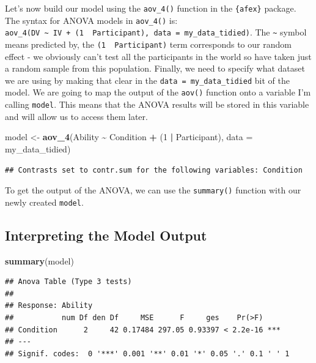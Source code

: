 \documentclass[
]{book}
\newenvironment{Shaded}{\begin{snugshade}}{\end{snugshade}}
\newcommand{\AttributeTok}[1]{\textcolor[rgb]{0.13,0.29,0.53}{#1}}
\newcommand{\DecValTok}[1]{\textcolor[rgb]{0.00,0.00,0.81}{#1}}
\newcommand{\FunctionTok}[1]{\textcolor[rgb]{0.13,0.29,0.53}{\textbf{#1}}}
\newcommand{\NormalTok}[1]{#1}
\newcommand{\OtherTok}[1]{\textcolor[rgb]{0.56,0.35,0.01}{#1}}
\newcommand{\SpecialCharTok}[1]{\textcolor[rgb]{0.81,0.36,0.00}{\textbf{#1}}}
\begin{document}
Let's now build our model using the \texttt{aov\_4()} function in the \texttt{\{afex\}} package. The syntax for ANOVA models in \texttt{aov\_4()} is: \texttt{aov\_4(DV\ \textasciitilde{}\ IV\ +\ (1\ \textbar{}\ Participant),\ data\ =\ my\_data\_tidied)}. The \texttt{\textasciitilde{}} symbol means predicted by, the \texttt{(1\ \textbar{}\ Participant)} term corresponds to our random effect - we obviously can't test all the participants in the world so have taken just a random sample from this population. Finally, we need to specify what dataset we are using by making that clear in the \texttt{data\ =\ my\_data\_tidied} bit of the model. We are going to map the output of the \texttt{aov()} function onto a variable I'm calling \texttt{model}. This means that the ANOVA results will be stored in this variable and will allow us to access them later.

\begin{Shaded}
\begin{Highlighting}[]
\NormalTok{model }\OtherTok{\textless{}{-}} \FunctionTok{aov\_4}\NormalTok{(Ability }\SpecialCharTok{\textasciitilde{}}\NormalTok{ Condition }\SpecialCharTok{+}\NormalTok{ (}\DecValTok{1} \SpecialCharTok{|}\NormalTok{ Participant), }\AttributeTok{data =}\NormalTok{ my\_data\_tidied)}
\end{Highlighting}
\end{Shaded}

\begin{verbatim}
## Contrasts set to contr.sum for the following variables: Condition
\end{verbatim}

To get the output of the ANOVA, we can use the \texttt{summary()} function with our newly created \texttt{model}.

\hypertarget{interpreting-the-model-output}{%
\subsection{Interpreting the Model Output}\label{interpreting-the-model-output}}

\begin{Shaded}
\begin{Highlighting}[]
\FunctionTok{summary}\NormalTok{(model)}
\end{Highlighting}
\end{Shaded}

\begin{verbatim}
## Anova Table (Type 3 tests)
## 
## Response: Ability
##           num Df den Df     MSE      F     ges    Pr(>F)    
## Condition      2     42 0.17484 297.05 0.93397 < 2.2e-16 ***
## ---
## Signif. codes:  0 '***' 0.001 '**' 0.01 '*' 0.05 '.' 0.1 ' ' 1
\end{verbatim}
\end{document}
